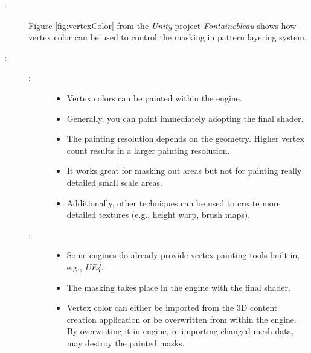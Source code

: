 \begin{description}
	\item[\patExamples:]%
	Figure \ref{fig:vertexColor} from the \emph{Unity} project \emph{Fontainebleau} \cite{fontainebleu2018} shows how vertex color can be used to control the masking in pattern layering system.
	\item[\patConsequences:]\hfill 
		\begin{description}
			\item[\visual:]\hfill
			\begin{itemize}\mynobreakpar
				\item Vertex colors can be painted within the engine.
				\item Generally, you can paint immediately adopting the final shader. 
				\item The painting resolution depends on the geometry. Higher vertex count results in a larger painting resolution. 
				\item It works great for masking out areas but not for painting really detailed small scale areas. 
				\item Additionally, other techniques can be used to create more detailed textures (e.g., height warp, brush maps).
			\end{itemize}
			\item[\pipeline:]\hfill
			\begin{itemize}\mynobreakpar
				\item Some engines do already provide vertex painting tools built-in, e.g., \emph{UE4}.
				\item The masking takes place in the engine with the final shader. 
				\item Vertex color can either be imported from the 3D content creation application or be overwritten from within the engine. By overwriting it in engine, re-importing changed mesh data, may destroy the painted masks.  
			\end{itemize}
		\end{description}
\end{description}


